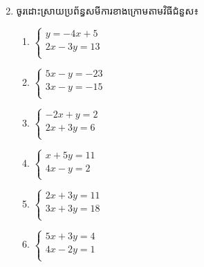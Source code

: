 \begin{enumerate}
\begin{enumerate}[label=\alph*.]
\begin{multicols}{2}
\end{multicols}
\end{enumerate}


\item ចូរដោះស្រាយប្រព័ន្ធសមីការខាងក្រោមតាមវិធីជំនួស៖
\begin{enumerate}[label=\alph*.]

\item 
$\begin{cases}
y=-4x+5\\
2x-3y=13\\
\end{cases}$

\item 
$\begin{cases}
 5x-y=-23\\
3x-y=-15\\
\end{cases}$

\item 
$\begin{cases}
 -2x+y=2\\
2x+3y=6\\
\end{cases}$

\item 
$\begin{cases}
x+5y=11 \\
4x-y=2\\
\end{cases}$

\item 
$\begin{cases}
2x+3y=11\\
3x+3y=18\\
\end{cases}$
\item 
$\begin{cases}
 5x+3y=4\\
4x-2y=1\\
\end{cases}$




\end{enumerate}
\end{enumerate}
